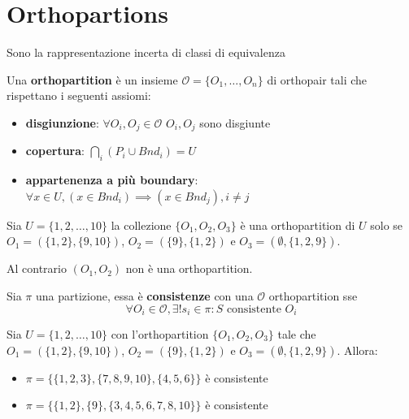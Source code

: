 \section{Orthopartions}
Sono la rappresentazione incerta di classi di equivalenza

\begin{definizione}
    Una \textbf{orthopartition} è un insieme $\mathcal{O} = \{O_1,\dots, O_n\}$ di 
    orthopair tali che rispettano i seguenti assiomi:
    \begin{itemize}
        \item \textbf{disgiunzione}: $\forall O_i, O_j\in \mathcal{O}$ $O_i,O_j$ sono 
        disgiunte
        \item \textbf{copertura}: $\bigcap _i (P_i\cup Bnd_i) = U$
        \item \textbf{appartenenza a più boundary}: $\forall x\in U, (x\in Bnd_i) \implies (x\in Bnd_j), i\ne j$
    \end{itemize}
\end{definizione}

\begin{esempio}
    Sia $U=\{1,2,\dots,10\}$ la collezione $\{O_1,O_2,O_3\}$ è una orthopartition
    di $U$ solo se $O_1 =(\{1,2\},\{9,10\})$, $O_2=(\{9\}, \{1,2\})$ e $O_3=(\emptyset,\{1,2,9\})$.

    Al contrario $(O_1,O_2)$ non è una orthopartition.
\end{esempio}

\begin{definizione}
    Sia $\pi$ una partizione, essa è \textbf{consistenze} con una $\mathcal{O}$ orthopartition
    sse 
    $$\forall O_i\in \mathcal{O},\exists !s_i \in \pi: S \text{ consistente }  O_i$$
\end{definizione}

\begin{esempio}
    Sia $U=\{1,2,\dots,10\}$ con l'orthopartition $\{O_1,O_2,O_3\}$ tale che $O_1 =(\{1,2\},\{9,10\})$, $O_2=(\{9\}, \{1,2\})$ e $O_3=(\emptyset,\{1,2,9\})$.
    Allora:
    \begin{itemize}
        \item $\pi = \{\{1,2,3\},\{7,8,9,10\},\{4,5,6\}\}$ è consistente
        \item $\pi = \{\{1,2\},\{9\},\{3,4,5,6,7,8,10\}\}$ è consistente
    \end{itemize}
\end{esempio}

